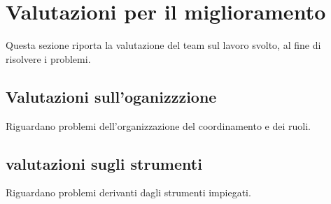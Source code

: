 \section{Valutazioni per il miglioramento}
Questa sezione riporta la valutazione del team sul lavoro svolto, al fine di risolvere i problemi.

\subsection{Valutazioni sull'oganizzzione}
Riguardano problemi dell'organizzazione del coordinamento e dei ruoli.

\subsection{valutazioni sugli strumenti}
Riguardano problemi derivanti dagli strumenti impiegati.